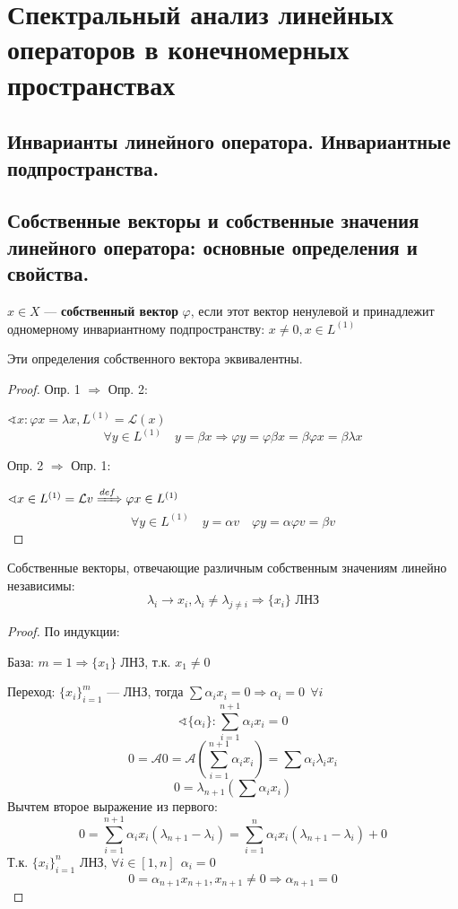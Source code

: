 \section{Спектральный анализ линейных операторов в конечномерных пространствах}

\subsection{Инварианты линейного оператора. Инвариантные подпространства. }

\subsection{Собственные векторы и собственные значения линейного оператора: основные определения и свойства. }
\begin{definition}
    $x\in X$ --- \textbf{собственный вектор} $\varphi$, если этот вектор ненулевой и принадлежит одномерному инвариантному подпространству: $x\not=0, x\in L^{(1)}$
\end{definition}
\begin{lemma}
    Эти определения собственного вектора эквивалентны.
\end{lemma}
\begin{proof}
    Опр. 1 $\Rightarrow$ Опр. 2:

    $\sphericalangle x : \varphi x = \lambda x, L^{(1)} = \mathcal L(x)$
    $$\forall y\in L^{(1)} \quad y = \beta x \Rightarrow \varphi y = \varphi \beta x = \beta \varphi x = \beta \lambda x$$

    Опр. 2 $\Rightarrow$ Опр. 1:

    $\sphericalangle x\in L^{(1)} = \mathcal L v \xRightarrow{def} \varphi x \in L^{(1)}$
    $$\forall y \in L^{(1)} \quad y = \alpha v \quad \varphi y = \alpha \varphi v = \beta v$$
\end{proof}
\begin{lemma}
    Собственные векторы, отвечающие различным собственным значениям линейно независимы:
    $$\lambda_i \to x_i, \lambda_i\not=\lambda_{j\not=i} \Rightarrow \{x_i\} \text{ ЛНЗ}$$
\end{lemma}
\begin{proof}
    По индукции:

    База: $m=1 \Rightarrow \{x_1\}$ ЛНЗ, т.к. $x_1\not=0$

    Переход: $\{x_i\}_{i=1}^m$ --- ЛНЗ, тогда $\sum \alpha_ix_i=0 \Rightarrow \alpha_i=0 \ \ \forall i$
    $$\sphericalangle \{\alpha_i\} : \sum_{i=1}^{n+1} \alpha_ix_i=0$$
    $$0 = \mathcal A 0 = \mathcal A\left(\sum_{i=1}^{n+1} \alpha_ix_i\right) = \sum \alpha_i \lambda_i x_i$$
    $$0 = \lambda_{n+1}\left(\sum \alpha_ix_i\right)$$
    Вычтем второе выражение из первого:
    $$0 = \sum_{i=1}^{n+1} \alpha_i x_i (\lambda_{n+1} - \lambda_{i}) = \sum_{i=1}^n \alpha_i x_i (\lambda_{n+1} - \lambda_{i}) + 0$$
    Т.к. $\{x_i\}_{i=1}^n$ ЛНЗ, $\forall i \in [1, n] \ \ \alpha_i = 0$
    $$0 = \alpha_{n+1} x_{n+1}, x_{n+1}\not=0 \Rightarrow \alpha_{n+1}=0$$
\end{proof}
